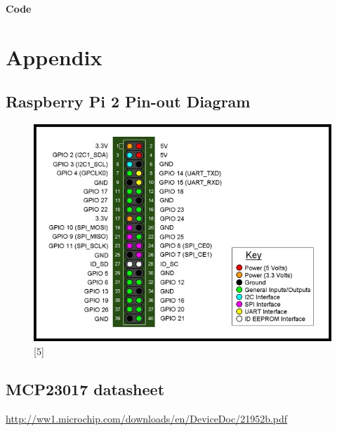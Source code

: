 \documentclass[11pt,a4paper]{article}
\begin{document}
	\newpage 
	\textbf{Code}
	\vspace{0.3cm}
	
	
	
	\vspace{0.3cm}
	
	
	\newpage
	\section{Appendix}
	
	\subsection{Raspberry Pi 2 Pin-out Diagram}
	\begin{figure}[h!]
		\includegraphics[scale=0.6]{RaspberryPi2_pinout.jpg}
		\centering
		\caption{[5]}
	\end{figure}
	\subsection{MCP23017 datasheet}
		
	\url{http://ww1.microchip.com/downloads/en/DeviceDoc/21952b.pdf}
\end{document}
